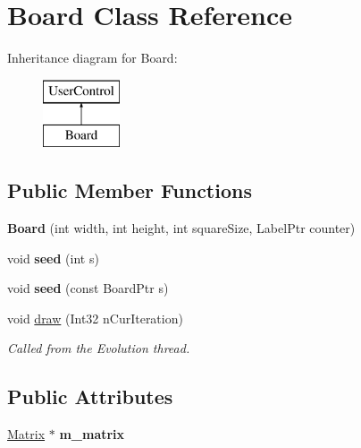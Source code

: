 \hypertarget{classBoard}{}\section{Board Class Reference}
\label{classBoard}
Inheritance diagram for Board\+:\begin{figure}[H]
\begin{center}
\leavevmode
\includegraphics[height=2.000000cm]{classBoard}
\end{center}
\end{figure}
\subsection*{Public Member Functions}
\begin{DoxyCompactItemize}
\item 
\hypertarget{classBoard_ad3655f523690b17f533cd3a64d337a07}{}{\bfseries Board} (int width, int height, int square\+Size, Label\+Ptr counter)\label{classBoard_ad3655f523690b17f533cd3a64d337a07}

\item 
\hypertarget{classBoard_acdba4d6789bb2ccb6651fdd06f3382d3}{}void {\bfseries seed} (int s)\label{classBoard_acdba4d6789bb2ccb6651fdd06f3382d3}

\item 
\hypertarget{classBoard_a92e90e6e609bdadcd7cada40cdf1d08d}{}void {\bfseries seed} (const Board\+Ptr s)\label{classBoard_a92e90e6e609bdadcd7cada40cdf1d08d}

\item 
\hypertarget{classBoard_a00d6495e1cbcb36e0051ecc394b14657}{}void \hyperlink{classBoard_a00d6495e1cbcb36e0051ecc394b14657}{draw} (Int32 n\+Cur\+Iteration)\label{classBoard_a00d6495e1cbcb36e0051ecc394b14657}

\begin{DoxyCompactList}\small\item\em Called from the Evolution thread. \end{DoxyCompactList}\end{DoxyCompactItemize}
\subsection*{Public Attributes}
\begin{DoxyCompactItemize}
\item 
\hypertarget{classBoard_ad41abf005ff90a876cdad26ac1ed6f31}{}\hyperlink{classMatrix}{Matrix} $\ast$ {\bfseries m\+\_\+matrix}\label{classBoard_ad41abf005ff90a876cdad26ac1ed6f31}

\end{DoxyCompactItemize}
